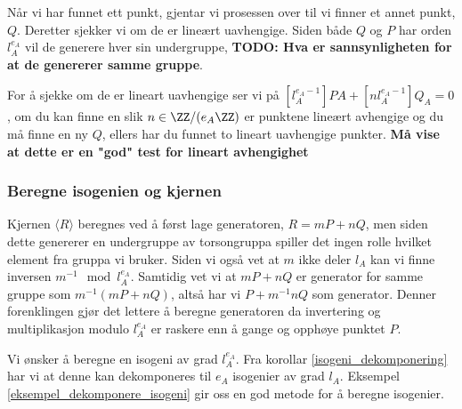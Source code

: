Når vi har funnet ett punkt, gjentar vi prosessen over til vi finner et annet punkt, $Q$. Deretter sjekker vi om de er lineært uavhengige. Siden både $Q$ og $P$ har orden $l_A^{e_A}$ vil de generere hver sin undergruppe, \textbf{TODO: Hva er sannsynligheten for at de genererer samme gruppe}.  

For å sjekke om de er lineart uavhengige ser vi på $[l_A^{e_A - 1}]PA + [n l_A^{e_A - 1}]Q_A = 0$, om du kan finne en slik $n \in \ZZ/(e_A \ZZ)$ er punktene lineært avhengige og du må finne en ny $Q$, ellers har du funnet to lineart uavhengige punkter. \textbf{Må vise at dette er en "god" test for lineart avhengighet}
\subsubsection*{Beregne isogenien og kjernen}
Kjernen $\langle R \rangle$ beregnes ved å først lage generatoren, $R = mP + nQ$, men siden dette genererer en undergruppe av torsongruppa spiller det ingen rolle hvilket element fra gruppa vi bruker. Siden vi også vet at $m$ ikke deler $l_A$ kan vi finne inversen $m^{-1} \mod{l_A^{e_A}}$. Samtidig vet vi at $mP + nQ$ er generator for samme gruppe som $m^{-1}(mP + nQ)$, altså har vi $P + m^{-1}nQ$ som generator. Denner forenklingen gjør det lettere å beregne generatoren da invertering og multiplikasjon modulo $l_A^{e_A}$ er raskere enn å gange og opphøye punktet $P$. 

Vi ønsker å beregne en isogeni av grad $l_A^{e_A}$. Fra korollar \ref{isogeni_dekomponering} har vi at denne kan dekomponeres til $e_A$ isogenier av grad $l_A$. Eksempel \ref{eksempel_dekomponere_isogeni} gir  oss en god metode for å beregne isogenier.
